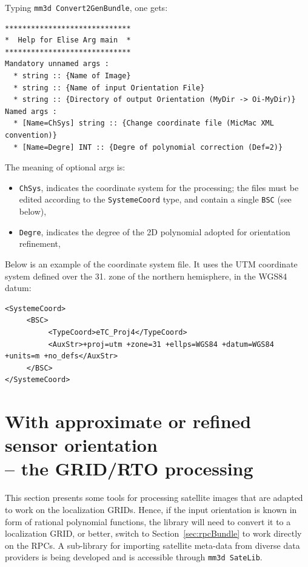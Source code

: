 \vspace{\baselineskip}
Typing {\tt mm3d Convert2GenBundle}, one gets:

\begin{verbatim}
*****************************
*  Help for Elise Arg main  *
*****************************
Mandatory unnamed args : 
  * string :: {Name of Image}
  * string :: {Name of input Orientation File}
  * string :: {Directory of output Orientation (MyDir -> Oi-MyDir)}
Named args : 
  * [Name=ChSys] string :: {Change coordinate file (MicMac XML convention)}
  * [Name=Degre] INT :: {Degre of polynomial correction (Def=2)}
\end{verbatim}

The meaning of optional args is:

\begin{itemize}
   \item {\tt ChSys}, indicates the coordinate system for the processing; the files must be edited according to the {\tt SystemeCoord} type, and contain a single {\tt BSC} (see below),
   \item {\tt Degre}, indicates the degree of the 2D polynomial adopted for orientation refinement,
\end{itemize}

Below is an example of the coordinate system file. It uses the UTM coordinate system defined over the 31. zone of the northern hemisphere, in the WGS84 datum:

\begin{verbatim}
<SystemeCoord>
     <BSC>
          <TypeCoord>eTC_Proj4</TypeCoord>
          <AuxStr>+proj=utm +zone=31 +ellps=WGS84 +datum=WGS84 +units=m +no_defs</AuxStr>
     </BSC>
</SystemeCoord>
\end{verbatim}




\section{With approximate or refined sensor orientation \\-- the GRID/RTO processing}\label{sec:gridProc}
This section presents some tools for processing satellite images that are adapted to work on the localization GRIDs. Hence, if the input orientation is known in form of rational polynomial functions, the library will need to convert it to a localization GRID, or better, switch to Section~\ref{sec:rpcBundle} to work directly on the RPCs. A sub-library for importing satellite meta-data from diverse data providers is being developed and is accessible through {\tt mm3d SateLib}.

